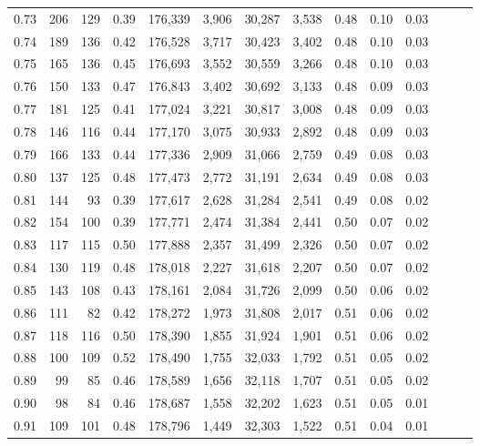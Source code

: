 \begin{tabular}{rrrrrrrrrrrrrr}
0.73 &    206 &  129 &  0.39 &  176,339 &    3,906 &  30,287 &   3,538 &  0.48 &  0.10 &      0.03 \\
0.74 &    189 &  136 &  0.42 &  176,528 &    3,717 &  30,423 &   3,402 &  0.48 &  0.10 &      0.03 \\
0.75 &    165 &  136 &  0.45 &  176,693 &    3,552 &  30,559 &   3,266 &  0.48 &  0.10 &      0.03 \\
0.76 &    150 &  133 &  0.47 &  176,843 &    3,402 &  30,692 &   3,133 &  0.48 &  0.09 &      0.03 \\
0.77 &    181 &  125 &  0.41 &  177,024 &    3,221 &  30,817 &   3,008 &  0.48 &  0.09 &      0.03 \\
0.78 &    146 &  116 &  0.44 &  177,170 &    3,075 &  30,933 &   2,892 &  0.48 &  0.09 &      0.03 \\
0.79 &    166 &  133 &  0.44 &  177,336 &    2,909 &  31,066 &   2,759 &  0.49 &  0.08 &      0.03 \\
0.80 &    137 &  125 &  0.48 &  177,473 &    2,772 &  31,191 &   2,634 &  0.49 &  0.08 &      0.03 \\
0.81 &    144 &   93 &  0.39 &  177,617 &    2,628 &  31,284 &   2,541 &  0.49 &  0.08 &      0.02 \\
0.82 &    154 &  100 &  0.39 &  177,771 &    2,474 &  31,384 &   2,441 &  0.50 &  0.07 &      0.02 \\
0.83 &    117 &  115 &  0.50 &  177,888 &    2,357 &  31,499 &   2,326 &  0.50 &  0.07 &      0.02 \\
0.84 &    130 &  119 &  0.48 &  178,018 &    2,227 &  31,618 &   2,207 &  0.50 &  0.07 &      0.02 \\
0.85 &    143 &  108 &  0.43 &  178,161 &    2,084 &  31,726 &   2,099 &  0.50 &  0.06 &      0.02 \\
0.86 &    111 &   82 &  0.42 &  178,272 &    1,973 &  31,808 &   2,017 &  0.51 &  0.06 &      0.02 \\
0.87 &    118 &  116 &  0.50 &  178,390 &    1,855 &  31,924 &   1,901 &  0.51 &  0.06 &      0.02 \\
0.88 &    100 &  109 &  0.52 &  178,490 &    1,755 &  32,033 &   1,792 &  0.51 &  0.05 &      0.02 \\
0.89 &     99 &   85 &  0.46 &  178,589 &    1,656 &  32,118 &   1,707 &  0.51 &  0.05 &      0.02 \\
0.90 &     98 &   84 &  0.46 &  178,687 &    1,558 &  32,202 &   1,623 &  0.51 &  0.05 &      0.01 \\
0.91 &    109 &  101 &  0.48 &  178,796 &    1,449 &  32,303 &   1,522 &  0.51 &  0.04 &      0.01 \\

\end{tabular}
